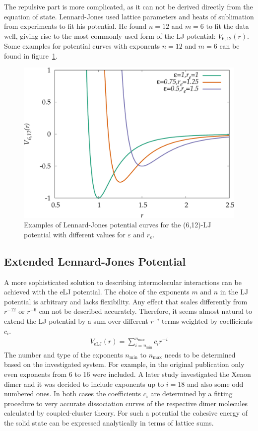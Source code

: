 The repulsive part is more complicated, as it can not be derived directly from
the equation of state. Lennard-Jones used lattice parameters and heats of
sublimation from experiments to fit his potential. He found $n=12$ and $m=6$ to
fit the data well, giving rise to the most commonly used form of the \ac{LJ}
potential: $V_{6,12}(r)$.\autocite{Lennard-Jones_Cohesion_1931} Some examples
for potential curves with exponents $n=12$ and $m=6$ can be found in
figure~\ref{fig:LJ-param}.
%
\begin{figure}[htb]
    \centering
    \includegraphics[width=.8\textwidth]{plot/LJ-param.pdf}
    \caption{Examples of Lennard-Jones potential curves for the (6,12)-\acs{LJ}
    potential with different values for $\varepsilon$ and $r_e$.}
    \label{fig:LJ-param}
\end{figure}

\subsection{Extended Lennard-Jones Potential}
\label{sec:eLJ}

A more sophisticated solution to describing intermolecular interactions can
be achieved with the \acf{eLJ} potential. The choice of the exponents $m$ and $n$ in
the \ac{LJ} potential is arbitrary and lacks flexibility. Any effect that scales
differently from $r^{-12}$ or $r^{-6}$ can not be described accurately.
Therefore, it seems almost natural to extend the \ac{LJ} potential by a sum over
different $r^{-i}$ terms weighted by coefficients $c_i$.
%
\begin{align}
    V_\text{eLJ}(r)=\sum_{i=n_\text{min}}^{n_\text{max}} c_{i}r^{-i}\label{eqn:ELJ}
\end{align}
%
The number and type of the exponents $n_\text{min}$ to $n_\text{max}$ needs to
be determined based on the investigated system. For example, in the original
publication only even exponents from 6 to 16 were
included.\autocite{Schwerdtfeger_ExtensionLennardJonespotential_2006} A later
study investigated the Xenon dimer and it was decided to include exponents up to
$i=18$ and also some odd numbered
ones.\autocite{Jerabek_relativisticcoupledclusterinteraction_2017} In both cases
the coefficients $c_i$ are determined by a fitting procedure to very accurate
dissociation curves of the respective dimer molecules calculated by
coupled-cluster theory. For such a potential the cohesive energy of the solid
state can be expressed analytically in terms of lattice
sums.\autocite{Schwerdtfeger_ExtensionLennardJonespotential_2006}

